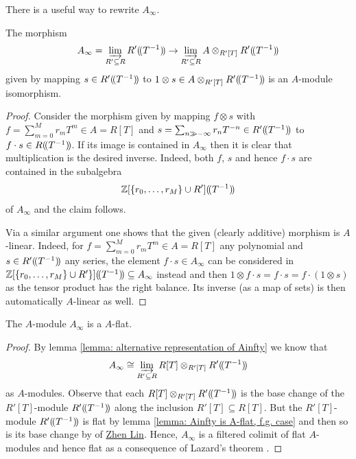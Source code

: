 There is a useful way to rewrite $A_\infty$.
\begin{lemma}
	\label{lemma: alternative representation of Ainfty}
	
	The morphism
		$$A_\infty = \varinjlim_{R'\subseteq R} {R'(\!(T^{-1})\!)} \to \varinjlim_{R'\subseteq R} A\otimes_{R'[T]} {R'(\!(T^{-1})\!)}$$
	given by mapping $s \in {R'(\!(T^{-1})\!)}$ to $1\otimes s\in A\otimes_{R'[T]} {R'(\!(T^{-1})\!)}$ is an $A$-module isomorphism.
\end{lemma}
\begin{proof}
	Consider the morphism given by mapping $f\otimes s$ with $f = \sum_{m=0}^M r_m T^m \in A=R[T]$ and $s=\sum_{n\gg -\infty} r_nT^{-n} \in {R'(\!(T^{-1})\!)}$ to $f\cdot s \in {R(\!(T^{-1})\!)}$. If its image is contained in $A_\infty$ then it is clear that multiplication is the desired inverse. Indeed, both $f$, $s$ and hence $f\cdot s$ are contained in the subalgebra
		$${{\mathbb{Z}}[\{r_0, \dots, r_M\}\cup R'](\!(T^{-1})\!)}$$
	of $A_\infty$ and the claim follows.
	
	Via a similar argument one shows that the given (clearly additive) morphism is $A$-linear. Indeed, for $f=\sum_{m=0}^M r_mT^m\in A=R[T]$ any polynomial and $s\in{R'(\!(T^{-1})\!)}$ any series, the element $f\cdot s \in A_\infty$ can be considered in ${{\mathbb{Z}}[\{r_0,\dots, r_M\}\cup R'\}](\!(T^{-1})\!)}\subseteq A_\infty$ instead and then $1\otimes f\cdot s = f\cdot s = f\cdot(1\otimes s)$ as the tensor product has the right balance. Its inverse (as a map of sets) is then automatically $A$-linear as well.
\end{proof}

\begin{lemma}[Flatness]
	The $A$-module $A_\infty$ is a $A$-flat.
\end{lemma}
\begin{proof}
	
	By lemma \ref{lemma: alternative representation of Ainfty} we know that
		$$A_\infty \cong \varinjlim_{R'\subseteq R} R[T]\otimes_{R'[T]} {R'(\!(T^{-1})\!)}$$
	as $A$-modules. Observe that each $R[T]\otimes_{R'[T]} {R'(\!(T^{-1})\!)}$ is the base change of the $R'[T]$-module ${R'(\!(T^{-1})\!)}$ along the inclusion $R'[T]\subseteq R[T]$. But the $R'[T]$-module ${R'(\!(T^{-1})\!)}$ is flat by lemma \ref{lemma: Ainfty is A-flat, f.g. case} and then so is its base change by \cite[\href{https://math.stackexchange.com/a/120839/529214}{this argument}]{zhenlinbasechange} of \href{https://math.stackexchange.com/users/5191/zhen-lin}{Zhen Lin}. Hence, $A_\infty$ is a filtered colimit of flat $A$-modules and hence flat as a consequence of Lazard's theorem \cite[\href{https://stacks.math.columbia.edu/tag/058G}{Tag 058G}]{stacks-project}.
\end{proof}

